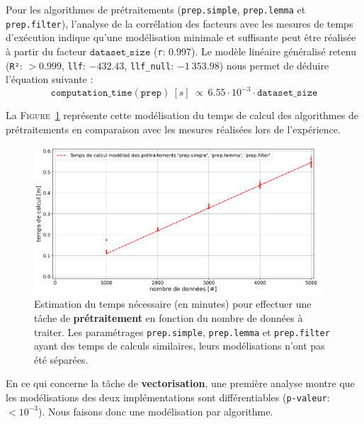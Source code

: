 			Pour les algorithmes de prétraitements (\texttt{prep.simple}, \texttt{prep.lemma} et \texttt{prep.filter}), l'analyse de la corrélation des facteurs avec les mesures de temps d'exécution indique qu'une modélisation minimale et suffisante peut être réalisée à partir du facteur $\texttt{dataset\_size}$ (\texttt{r}: $0.997$).
			Le modèle linéaire généralisé retenu (\texttt{R²}: $> 0.999$, \texttt{llf}: $-432.43$, \texttt{llf\_null}: $-1~353.98$) nous permet de déduire l'équation suivante :
			\begin{equation}
				\texttt{computation\_time}(\texttt{prep})~[s]~
				\propto~6.55 \cdot 10^{-3} \cdot \texttt{dataset\_size}
			\end{equation}
			
			La \textsc{Figure~\ref{figure:4.3.2-ETUDE-COUTS-TEMPS-CALCUL-MODELISATION-PREPROCESSING}} représente cette modélisation du temps de calcul des algorithmes de prétraitements en comparaison avec les mesures réalisées lors de l'expérience.
			\newline
			\begin{figure}[!htb]
				\centering
				\includegraphics[width=0.95\textwidth]{figures/etude-temps-calcul-modelisation-1prep}
				\caption{
					Estimation du temps nécessaire (en minutes) pour effectuer une tâche de \textbf{prétraitement} en fonction du nombre de données à traiter. Les paramétrages \texttt{prep.simple}, \texttt{prep.lemma} et \texttt{prep.filter} ayant des temps de calculs similaires, leurs modélisations n'ont pas été séparées.
				}
				\label{figure:4.3.2-ETUDE-COUTS-TEMPS-CALCUL-MODELISATION-PREPROCESSING}
			\end{figure}
			
			
			En ce qui concerne la tâche de \textbf{vectorisation}, une première analyse montre que les modélisations des deux implémentations sont différentiables (\texttt{p-valeur}: $< 10^{-3}$). Nous faisons donc une modélisation par algorithme.
		
